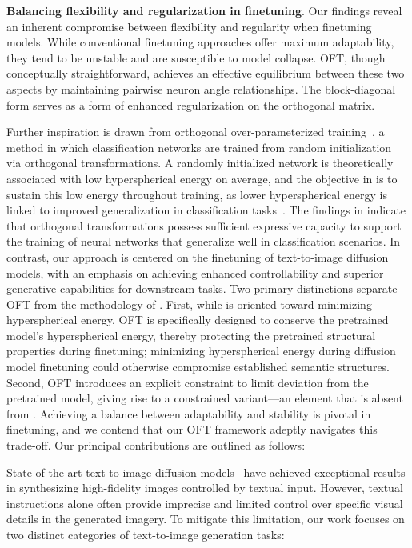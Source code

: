 \begin{itemize}[leftmargin=*,nosep]

\textbf{Balancing flexibility and regularization in finetuning}. Our findings reveal an inherent compromise between flexibility and regularity when finetuning models. While conventional finetuning approaches offer maximum adaptability, they tend to be unstable and are susceptible to model collapse. OFT, though conceptually straightforward, achieves an effective equilibrium between these two aspects by maintaining pairwise neuron angle relationships. The block-diagonal form serves as a form of enhanced regularization on the orthogonal matrix.

Further inspiration is drawn from orthogonal over-parameterized training~\cite{liu2021orthogonal}, a method in which classification networks are trained from random initialization via orthogonal transformations. A randomly initialized network is theoretically associated with low hyperspherical energy on average, and the objective in \cite{liu2021orthogonal} is to sustain this low energy throughout training, as lower hyperspherical energy is linked to improved generalization in classification tasks~\cite{liu2018learning,lin2020regularizing}. The findings in \cite{liu2021orthogonal} indicate that orthogonal transformations possess sufficient expressive capacity to support the training of neural networks that generalize well in classification scenarios. In contrast, our approach is centered on the finetuning of text-to-image diffusion models, with an emphasis on achieving enhanced controllability and superior generative capabilities for downstream tasks. Two primary distinctions separate OFT from the methodology of \cite{liu2021orthogonal}. First, while \cite{liu2021orthogonal} is oriented toward minimizing hyperspherical energy, OFT is specifically designed to conserve the pretrained model’s hyperspherical energy, thereby protecting the pretrained structural properties during finetuning; minimizing hyperspherical energy during diffusion model finetuning could otherwise compromise established semantic structures. Second, OFT introduces an explicit constraint to limit deviation from the pretrained model, giving rise to a constrained variant—an element that is absent from \cite{liu2021orthogonal}. Achieving a balance between adaptability and stability is pivotal in finetuning, and we contend that our OFT framework adeptly navigates this trade-off. Our principal contributions are outlined as follows:

State-of-the-art text-to-image diffusion models~\cite{saharia2022photorealistic,ramesh2022hierarchical,rombach2022high} have achieved exceptional results in synthesizing high-fidelity images controlled by textual input. However, textual instructions alone often provide imprecise and limited control over specific visual details in the generated imagery. To mitigate this limitation, our work focuses on two distinct categories of text-to-image generation tasks:


\end{itemize}
